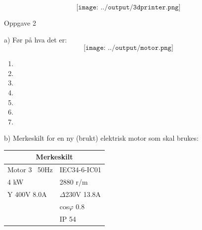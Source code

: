$$\texttt{[image: ../output/3dprinter.png]}$$

Oppgave 2


a) Før på hva det er: \\ 

$$\texttt{[image: ../output/motor.png]}$$

\begin{enumerate}
	\item 
	\item 
	\item 
	\item 
	\item 
	\item 
	\item 
\end{enumerate}

\filbreak
b) Merkeskilt for en ny (brukt) elektrisk motor som skal brukes: \\

\begin{center}
\begin{tabular}{ | m{3cm} | m{3cm} | } 
\hline
\multicolumn{2}{|c|}{Merkeskilt} \\
\hline
Motor 3~ 50Hz	& IEC34-6-IC01 \\ 
\hline
4 kW & 2880 r/m \\
\hline
Y 400V 8.0A & $\Delta$230V 13.8A \\
\hline
& cos$\varphi$ 0.8 \\
\hline
& IP 54 \\
\hline
\end{tabular}
\end{center}

